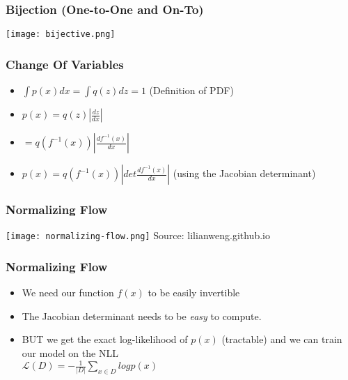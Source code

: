 \begin{frame}
    \frametitle{Bijection (One-to-One and On-To)}
    \texttt{[image: bijective.png]}
\end{frame}

\begin{frame}
    \frametitle{Change Of Variables}
    \begin{itemize}
        \item<1-> $\int p(x)dx = \int q(z)dz = 1$ (Definition of PDF)
        \item<2-> $p(x) = q(z) \left | \frac{dz}{dx} \right |$
        \item<3-> $= q(f^{-1}(x))\left | \frac{df^{-1}(x)}{dx}\right |$
        \item<4-> $p(x) = q(f^{-1}(x))\left | det\frac{df^{-1}(x)}{dx} \right |$
            (using the Jacobian determinant)
    \end{itemize}
\end{frame}

\begin{frame}
    \frametitle{Normalizing Flow}
    \center\texttt{[image: normalizing-flow.png]}
    \tiny{Source: lilianweng.github.io}
\end{frame}

\begin{frame}
    \frametitle{Normalizing Flow}
    \begin{itemize}
        \item We need our function $f(x)$ to be easily invertible
        \item The Jacobian determinant needs to be \textit{easy} to compute.
        \item BUT we get the exact log-likelihood of $p(x)$ (tractable) and we
            can train our model on the NLL \\$\mathcal{L}(D) = -\frac{1}{|D|}
            \sum\limits_{x\in D} log{p(x)}$
    \end{itemize}
\end{frame}

